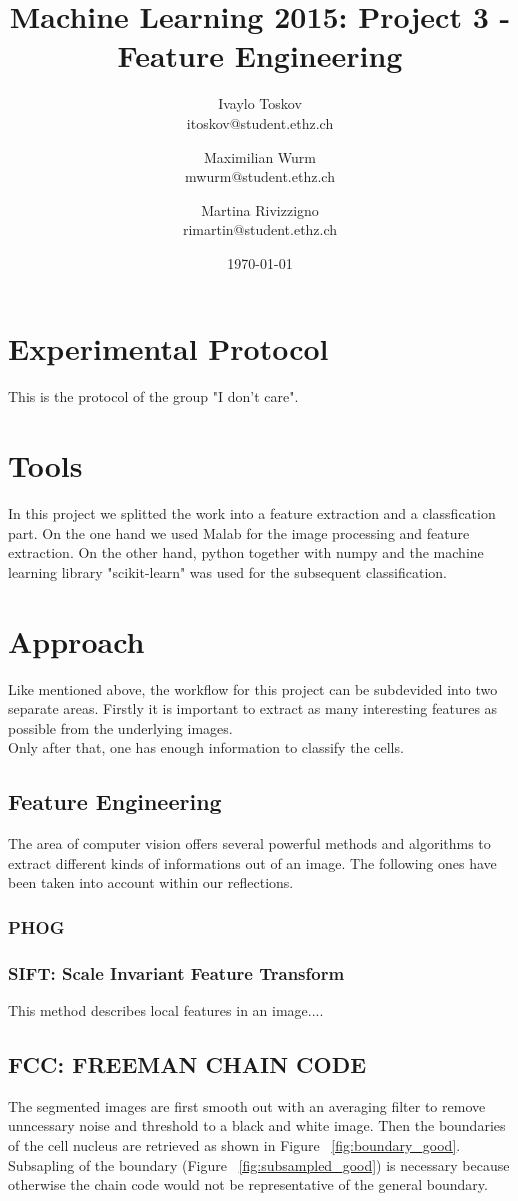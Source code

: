 \documentclass[a4paper, 11pt]{article}
\title{Machine Learning 2015: Project 3 - Feature Engineering}
\author{Ivaylo Toskov \\ itoskov@student.ethz.ch \and Maximilian Wurm \\ mwurm@student.ethz.ch \and 
	Martina Rivizzigno \\ rimartin@student.ethz.ch\\}
\date{\today}
\begin{document}
	\maketitle
	
	\section*{Experimental Protocol}
	This is the protocol of the group "I don't care".
	
	\section{Tools}
	In this project we splitted the work into a feature extraction and a classfication part.
	On the one hand we used Malab	for the image processing and feature extraction. 
	On the other hand, python together with numpy and the machine learning library "scikit-learn" was used for the subsequent classification.

	
	\section{Approach}
	Like mentioned above, the workflow for this project can be subdevided into two separate areas. 
	Firstly it is important to extract as many interesting features as possible from the underlying images. \\
	Only after that, one has enough information to classify the cells.

	
	\subsection{Feature Engineering}
	The area of computer vision offers several powerful methods and algorithms to extract different kinds of informations out of an image. The following ones have been taken into account within our reflections.

	\subsubsection{PHOG}
	\subsubsection{SIFT: Scale Invariant Feature Transform}
	This method describes local features in an image....
	
	\subsection{FCC: FREEMAN CHAIN CODE}
	The segmented images are first smooth out with an averaging filter to remove unncessary noise and threshold to a black and white image. Then the boundaries of the cell nucleus are retrieved as shown in Figure ~\ref{fig:boundary_good}. Subsapling of the boundary (Figure ~\ref{fig:subsampled_good}) is necessary because otherwise the chain code would not be representative of the general boundary. 
	
\end{document}

